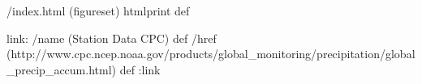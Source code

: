 /index.html {(figureset) htmlprint} def
\begin{ingrid}
link:
/name (Station Data CPC) def
/href (http://www.cpc.ncep.noaa.gov/products/global_monitoring/precipitation/global_precip_accum.html) def
:link

\end{ingrid}